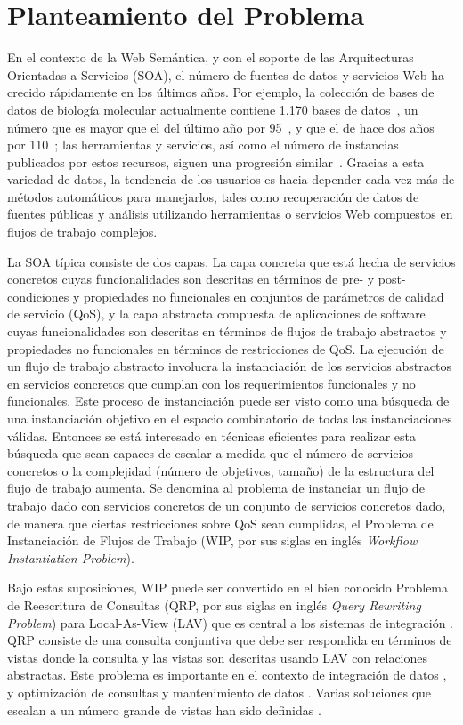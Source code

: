 \section{Planteamiento del Problema}

En el contexto de la Web Semántica, y con el soporte de las Arquitecturas Orientadas a
Servicios (SOA), el número de fuentes de datos y servicios Web ha crecido rápidamente en
los últimos años. Por ejemplo, la colección de bases de datos de biología
molecular actualmente contiene 1.170 bases de datos~\cite{Galperin09}, un número
que es
mayor que el del último año por 95~\cite{Galperin2008}, y que el de hace dos
años por 110~\cite{Galperin2007};
las herramientas y servicios, así como el número de instancias
publicados por estos recursos, siguen una progresión similar~\cite{Benson07}.
Gracias a
esta variedad de datos, la tendencia de los usuarios es hacia depender cada vez
más de métodos automáticos para manejarlos, tales como recuperación de datos de
fuentes públicas y análisis utilizando herramientas o servicios Web compuestos
en flujos de trabajo complejos.

La SOA típica consiste de dos capas. La capa concreta que está hecha de
servicios concretos cuyas funcionalidades son descritas en términos de pre- y
post-condiciones y propiedades no funcionales en conjuntos de parámetros de
calidad de servicio (QoS), y
la capa abstracta compuesta de aplicaciones de software cuyas funcionalidades
son descritas en términos de flujos de trabajo abstractos y propiedades no
funcionales en términos de restricciones de QoS. La ejecución de un flujo de
trabajo abstracto involucra la instanciación de los servicios abstractos en
servicios concretos que cumplan con los requerimientos funcionales y no
funcionales. Este proceso de instanciación puede ser visto como una búsqueda de
una instanciación objetivo en el espacio combinatorio de todas las
instanciaciones válidas. Entonces se está interesado en técnicas eficientes para
realizar esta búsqueda que sean capaces de escalar a medida que el número de
servicios concretos o la complejidad (número
de objetivos, tamaño) de la estructura del flujo de trabajo  aumenta. Se denomina al
problema de instanciar un flujo de trabajo dado con servicios concretos de un
conjunto de servicios concretos dado, de manera que ciertas restricciones sobre QoS sean
cumplidas, el Problema de Instanciación de Flujos de Trabajo (WIP, por sus siglas en inglés \emph{Workflow Instantiation Problem}).

Bajo estas suposiciones, WIP puede ser convertido en el bien conocido Problema
de Reescritura de Consultas (QRP, por sus siglas en inglés \emph{Query Rewriting Problem}) para Local-As-View (LAV) que es central a los sistemas de
integración \cite{halevy:survey}. QRP consiste de una consulta conjuntiva que debe ser
respondida en términos de vistas donde la consulta y las vistas son descritas
usando LAV con relaciones abstractas. Este problema es importante en el contexto
de integración de datos \cite{Chen05,JaudoinPRST05}, y optimización de consultas y mantenimiento
de datos \cite{AfratiLU07,levy:bucket}. Varias soluciones que escalan a un número grande de
vistas han sido definidas \cite{arvelo:aaai06,pods:DuschkaG97,sac:DuschkaG97,levy:bucket,pottinger:minicon}.

